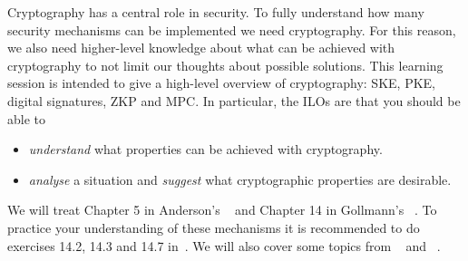 Cryptography has a central role in security.
To fully understand how many security mechanisms can be implemented we need 
cryptography.
For this reason, we also need higher-level knowledge about what can be achieved 
with cryptography to not limit our thoughts about possible solutions.
This learning session is intended to give a high-level overview of 
cryptography: \ac{SKE}, \ac{PKE}, digital signatures, \ac{ZKP} and \ac{MPC}.
In particular, the \acp{ILO} are that you should be able to
\begin{itemize}
  \item \emph{understand} what properties can be achieved with cryptography.
  \item \emph{analyse} a situation and \emph{suggest} what cryptographic 
    properties are desirable.
\end{itemize}

We will treat
Chapter 5 in Anderson's ~\cite{Anderson2008sea} and
Chapter 14 in Gollmann's ~\cite{Gollmann2011cs}.
To practice your understanding of these mechanisms it is recommended to do 
exercises 14.2, 14.3 and 14.7 in~\cite{Gollmann2011cs}.
We will also cover some topics from 
~\cite{KatzLindell-v1} and 
~\cite{GoldreichFOC-1}.

